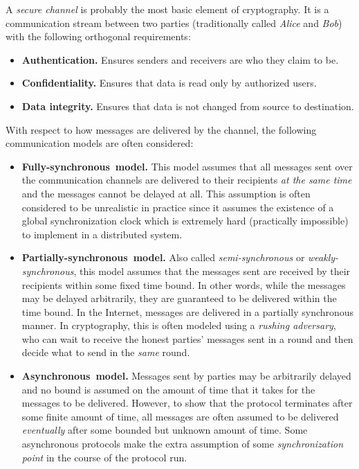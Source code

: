 \documentclass[11pt]{article}
\theoremstyle{plain}
\begin{document}
A \emph{secure channel} is probably the most basic element of cryptography.
It is a communication stream between two parties (traditionally called
\emph{Alice} and\emph{ Bob}) with the following orthogonal requirements:
\begin{itemize}
	\item \textbf{Authentication.} Ensures senders and receivers are who they
	claim to be.
	\item \textbf{Confidentiality.} Ensures that data is read only by authorized
	users.
	\item \textbf{Data integrity.} Ensures that data is not changed from source
	to destination.
\end{itemize}
With respect to how messages are delivered by the channel, the following
communication models are often considered:
\begin{itemize}
	\item \textbf{Fully-synchronous~model. }This model assumes that all messages
	sent over the communication channels are delivered to their recipients
	\emph{at the same time} and the messages cannot be delayed at all.
	This assumption is often considered to be unrealistic in practice
	since it assumes the existence of a global synchronization clock which
	is extremely hard (practically impossible) to implement in a distributed
	system.
	\item \textbf{Partially-synchronous~model. }Also called \emph{semi-synchronous}
	or \emph{weakly-synchronous}, this model assumes that the messages
	sent are received by their recipients within some fixed time bound.
	In other words, while the messages may be delayed arbitrarily, they
	are guaranteed to be delivered within the time bound. In the Internet,
	messages are delivered in a partially synchronous manner. In cryptography,
	this is often modeled using a \emph{rushing adversary}, who can wait
	to receive the honest parties' messages sent in a round and then decide
	what to send in the \emph{same }round.
	\item \textbf{Asynchronous~model. }Messages sent by parties may be arbitrarily
	delayed and no bound is assumed on the amount of time that it takes
	for the messages to be delivered. However, to show that the protocol
	terminates after some finite amount of time, all messages are often
	assumed to be delivered \emph{eventually }after some bounded but unknown
	amount of time.\textbf{ }Some asynchronous protocols make the extra
	assumption of some \emph{synchronization point} in the course of the
	protocol run.
\end{itemize}
\end{document}
